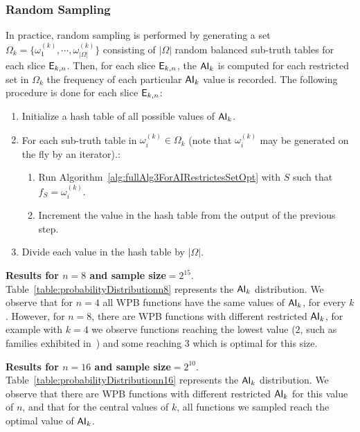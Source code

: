 \documentclass[11pt]{llncs}
\begin{document}
\subsubsection{Random Sampling}
In practice, random sampling is performed by generating a set $\Omega_k = \{\omega_1^{(k)}, \cdots, \omega_{|\Omega|}^{(k)}\}$ consisting of $|\Omega|$ random balanced sub-truth tables for each slice $\mathsf{E}_{k,n}$. 
Then, for each slice $\mathsf{E}_{k,n}$, the $\mathsf{AI}_{k}$ is computed for each restricted set in $\Omega_k$ the frequency of each particular $\mathsf{AI}_{k}$ value is recorded.
The following procedure is done for each slice $\mathsf{E}_{k,n}$:
\begin{enumerate}
    \item Initialize a hash table of all possible values of $\mathsf{AI}_{k}$.
    \item For each sub-truth table in $\omega_i^{(k)} \in \Omega_k$ (note that $\omega_i^{(k)}$ may be generated on the fly by an iterator).\footnotemark:
    \begin{enumerate}
        \item Run Algorithm~\ref{alg:fullAlg3ForAIRestrictesSetOpt} with $S$ such that $f_S = \omega_i^{(k)}$\label{enum:stepOfapplicationEnum}.
        \item Increment the value in the hash table from the output of the previous step.
    \end{enumerate}
    \item Divide each value in the hash table by $|\Omega|$.
\end{enumerate}

\noindent
\textbf{Results for $n=8$ and sample size$=2^{15}$}.
Table~\ref{table:probabilityDistributionn8} represents the $\mathsf{AI}_{k}$ distribution.
We observe that for $n=4$ all WPB functions have the same values of $\mathsf{AI}_{k}$, for every $k$. 
However, for $n=8$, there are WPB functions with different restricted $\mathsf{AI}_{k}$, for example with $k=4$ we observe functions reaching the lowest value ($2$, such as families exhibited in~\cite{Latin:GinMea23}) and some reaching $3$ which is optimal for this size.


\textbf{Results for $n=16$ and sample size$=2^{10}$}.
Table~\ref{table:probabilityDistributionn16} represents the $\mathsf{AI}_{k}$ distribution.
We observe that there are WPB functions with different restricted $\mathsf{AI}_{k}$ for this value of $n$, and that for the central values of $k$, all functions we sampled reach the optimal value of $\mathsf{AI}_{k}$.

\end{document}
